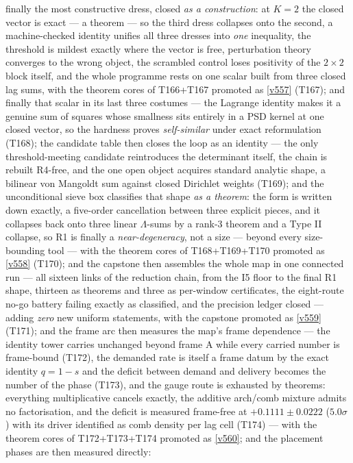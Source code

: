 \documentclass[11pt,a4paper]{article}
\begin{document}
finally the most constructive dress, closed \emph{as a construction}: at $K=2$ the closed
vector is exact --- a theorem --- so the third dress collapses onto the second, a
machine-checked identity unifies all three dresses into \emph{one} inequality, the threshold
is mildest exactly where the vector is free, perturbation theory converges to the wrong
object, the scrambled control loses positivity of the $2\times2$ block itself, and the whole
programme rests on one scalar built from three closed lag sums, with the theorem cores of
T166+T167 promoted as \vref{v557} (T167); and finally that scalar in its last three costumes ---
the Lagrange identity makes it a genuine sum of squares whose smallness sits entirely in a PSD
kernel at one closed vector, so the hardness proves \emph{self-similar} under exact reformulation
(T168); the candidate table then closes the loop as an identity --- the only threshold-meeting
candidate reintroduces the determinant itself, the chain is rebuilt R4-free, and the one open
object acquires standard analytic shape, a bilinear von Mangoldt sum against closed Dirichlet
weights (T169); and the unconditional sieve box classifies that shape \emph{as a theorem}: the
form is written down exactly, a five-order cancellation between three explicit pieces, and it
collapses back onto three linear $\Lambda$-sums by a rank-3 theorem and a Type II collapse, so
R1 is finally a \emph{near-degeneracy}, not a size --- beyond every size-bounding tool --- with
the theorem cores of T168+T169+T170 promoted as \vref{v558} (T170); and the capstone then
assembles the whole map in one connected run --- all sixteen links of the reduction chain, from
the I5 floor to the final R1 shape, thirteen as theorems and three as per-window certificates,
the eight-route no-go battery failing exactly as classified, and the precision ledger closed ---
adding \emph{zero} new uniform statements, with the capstone promoted as \vref{v559} (T171);
and the frame arc then measures the map's frame dependence --- the identity tower carries
unchanged beyond frame A while every carried number is frame-bound (T172), the demanded rate
is itself a frame datum by the exact identity $q=1-s$ and the deficit between demand and
delivery becomes the number of the phase (T173), and the gauge route is exhausted by
theorems: everything multiplicative cancels exactly, the additive arch/comb mixture admits
no factorisation, and the deficit is measured frame-free at $+0.1111\pm0.0222$ ($5.0\sigma$)
with its driver identified as comb density per lag cell (T174) --- with the theorem cores of
T172+T173+T174 promoted as \vref{v560}; and the placement phases are then measured directly:
\end{document}

